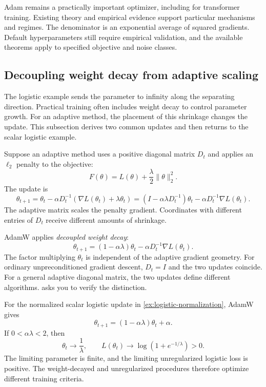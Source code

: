 \documentclass[11pt,twoside]{article}
\theoremstyle{definition}
\theoremstyle{remark}
\begin{document}
Adam remains a practically important optimizer, including for transformer
training. Existing theory and empirical evidence support particular
mechanisms and regimes. The denominator is an exponential average of squared
gradients. Default hyperparameters still require empirical validation, and
the available theorems apply to specified objective and noise classes.

\subsection{Decoupling weight decay from adaptive scaling}

The logistic example sends the parameter to infinity along the separating
direction. Practical training often includes weight decay to control parameter
growth. For an adaptive method, the placement of this shrinkage changes the
update. This subsection derives two common updates and then returns to
the scalar logistic example.

Suppose an adaptive method uses a positive diagonal matrix $D_t$ and applies
an $\ell_2$ penalty to the objective:
\[
 F(\theta)=L(\theta)+\frac\lambda2\|\theta\|_2^2.
\]
The update is
\begin{equation}
 \theta_{t+1}
 =\theta_t-\alpha D_t^{-1}(\nabla L(\theta_t)+\lambda\theta_t)
 =(I-\alpha\lambda D_t^{-1})\theta_t
   -\alpha D_t^{-1}\nabla L(\theta_t).
 \label{eq:adaptive-l2-update}
\end{equation}
The adaptive matrix scales the penalty gradient. Coordinates with different
entries of $D_t$ receive different amounts of shrinkage.

AdamW applies \emph{decoupled weight decay}:
\begin{equation}
 \theta_{t+1}
 =(1-\alpha\lambda)\theta_t
  -\alpha D_t^{-1}\nabla L(\theta_t).
 \label{eq:adamw-update}
\end{equation}
The factor multiplying $\theta_t$ is independent of the adaptive gradient
geometry. For ordinary unpreconditioned gradient descent, $D_t=I$ and the two
updates coincide. For a general adaptive diagonal matrix, the two updates
define different algorithms.  asks you to verify
the distinction.

For the normalized scalar logistic update in
\cref{ex:logistic-normalization}, AdamW gives
\begin{equation}
 \theta_{t+1}=(1-\alpha\lambda)\theta_t+\alpha.
 \label{eq:scalar-logistic-adamw}
\end{equation}
If $0<\alpha\lambda<2$, then
\begin{equation}
 \theta_t\longrightarrow\frac1\lambda,
 \qquad
 L(\theta_t)\longrightarrow\log(1+e^{-1/\lambda})>0.
 \label{eq:scalar-logistic-adamw-limit}
\end{equation}
The limiting parameter is finite, and the limiting unregularized logistic
loss is positive. The weight-decayed and unregularized procedures therefore
optimize different training criteria.
\end{document}
